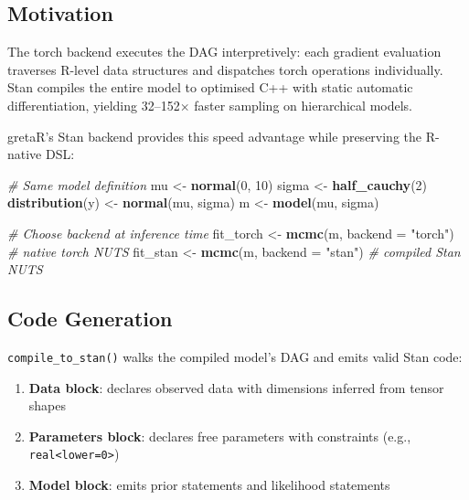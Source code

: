 \documentclass[
  11pt,
]{article}
\newenvironment{Shaded}{\begin{snugshade}}{\end{snugshade}}
\newcommand{\AttributeTok}[1]{\textcolor[rgb]{0.13,0.29,0.53}{#1}}
\newcommand{\CommentTok}[1]{\textcolor[rgb]{0.56,0.35,0.01}{\textit{#1}}}
\newcommand{\DecValTok}[1]{\textcolor[rgb]{0.00,0.00,0.81}{#1}}
\newcommand{\FunctionTok}[1]{\textcolor[rgb]{0.13,0.29,0.53}{\textbf{#1}}}
\newcommand{\NormalTok}[1]{#1}
\newcommand{\OtherTok}[1]{\textcolor[rgb]{0.56,0.35,0.01}{#1}}
\newcommand{\StringTok}[1]{\textcolor[rgb]{0.31,0.60,0.02}{#1}}
\providecommand{\tightlist}{%
  \setlength{\itemsep}{0pt}\setlength{\parskip}{0pt}}
\begin{document}
\subsection{Motivation}\label{motivation}

The torch backend executes the DAG interpretively: each gradient
evaluation traverses R-level data structures and dispatches torch
operations individually. Stan compiles the entire model to optimised C++
with static automatic differentiation, yielding 32--152\(\times\) faster
sampling on hierarchical models.

gretaR's Stan backend provides this speed advantage while preserving the
R-native DSL:

\begin{Shaded}
\begin{Highlighting}[]
\CommentTok{\# Same model definition}
\NormalTok{mu }\OtherTok{\textless{}{-}} \FunctionTok{normal}\NormalTok{(}\DecValTok{0}\NormalTok{, }\DecValTok{10}\NormalTok{)}
\NormalTok{sigma }\OtherTok{\textless{}{-}} \FunctionTok{half\_cauchy}\NormalTok{(}\DecValTok{2}\NormalTok{)}
\FunctionTok{distribution}\NormalTok{(y) }\OtherTok{\textless{}{-}} \FunctionTok{normal}\NormalTok{(mu, sigma)}
\NormalTok{m }\OtherTok{\textless{}{-}} \FunctionTok{model}\NormalTok{(mu, sigma)}

\CommentTok{\# Choose backend at inference time}
\NormalTok{fit\_torch }\OtherTok{\textless{}{-}} \FunctionTok{mcmc}\NormalTok{(m, }\AttributeTok{backend =} \StringTok{"torch"}\NormalTok{)  }\CommentTok{\# native torch NUTS}
\NormalTok{fit\_stan  }\OtherTok{\textless{}{-}} \FunctionTok{mcmc}\NormalTok{(m, }\AttributeTok{backend =} \StringTok{"stan"}\NormalTok{)   }\CommentTok{\# compiled Stan NUTS}
\end{Highlighting}
\end{Shaded}

\subsection{Code Generation}\label{code-generation}

\texttt{compile\_to\_stan()} walks the compiled model's DAG and emits
valid Stan code:

\begin{enumerate}
\def\labelenumi{\arabic{enumi}.}
\tightlist
\item
  \textbf{Data block}: declares observed data with dimensions inferred
  from tensor shapes
\item
  \textbf{Parameters block}: declares free parameters with constraints
  (e.g., \texttt{real\textless{}lower=0\textgreater{}})
\item
  \textbf{Model block}: emits prior statements and likelihood statements
\end{enumerate}
\end{document}
